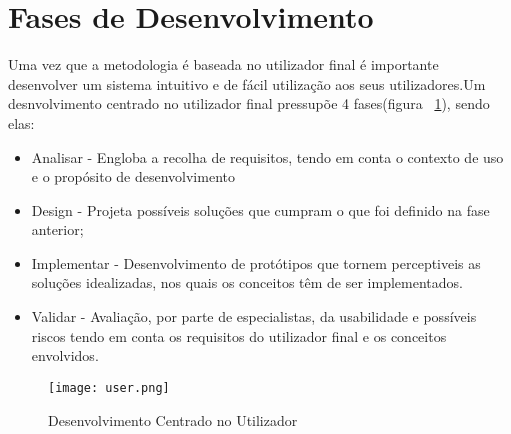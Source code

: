 \section{Fases de Desenvolvimento}

Uma vez que a metodologia é baseada no utilizador final é importante desenvolver um sistema intuitivo e de fácil utilização aos seus utilizadores.Um desnvolvimento centrado no utilizador final pressupõe 4 fases(figura ~\ref{fig:user-center}), sendo elas:
\begin{itemize}
\item Analisar - Engloba a recolha de requisitos, tendo em conta o contexto de uso e o propósito de desenvolvimento
\item Design - Projeta possíveis soluções que cumpram o que foi definido na fase anterior;
\item Implementar - Desenvolvimento de protótipos que tornem perceptiveis as soluções idealizadas, nos quais os conceitos têm de ser implementados.
\item Validar - Avaliação, por parte de especialistas, da usabilidade e possíveis riscos tendo em conta os requisitos do utilizador final e os conceitos envolvidos.
\end{itemize} 

\begin{figure}[h]
\centering
\texttt{[image: user.png]}
\caption[Desenvolvimento Centrado no Utilizador] {Desenvolvimento Centrado no Utilizador\protect\footnotemark}
\label{fig:user-center}
\end{figure}





